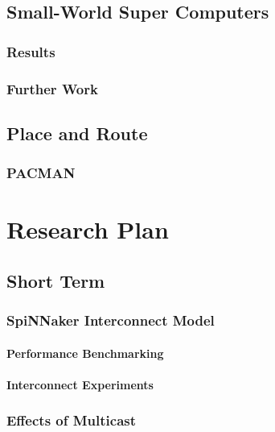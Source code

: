 \documentclass[a4paper,12pt,titlepage]{report}
\begin{document}
		\section{Small-World Super Computers}
			
			\subsection{Results}
			
			\subsection{Further Work}
		
		\section{Place and Route}
			
			\subsection{PACMAN}
	
	
	\chapter{Research Plan}
	
		\section{Short Term}
			
			\subsection{SpiNNaker Interconnect Model}
			
				\subsubsection{Performance Benchmarking}
				
				\subsubsection{Interconnect Experiments}
			
			\subsection{Effects of Multicast}
			
\end{document}
